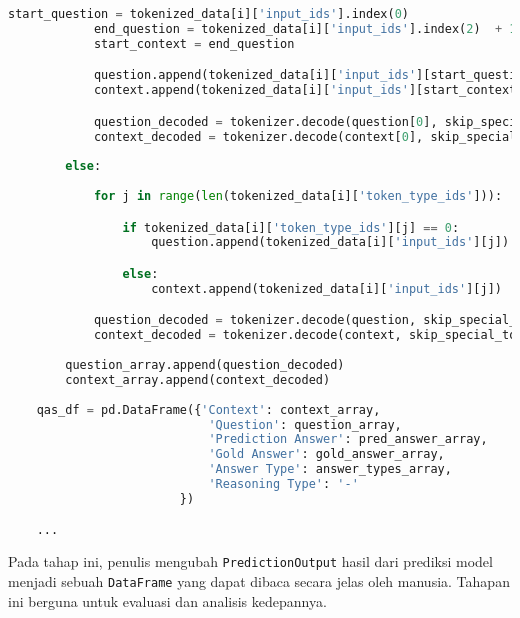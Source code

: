 \begin{lstlisting}[language=Python, caption=Representasi prediksi jawaban untuk evaluasi dan analisis]
            start_question = tokenized_data[i]['input_ids'].index(0)
            end_question = tokenized_data[i]['input_ids'].index(2)  + 1
            start_context = end_question

            question.append(tokenized_data[i]['input_ids'][start_question: end_question])
            context.append(tokenized_data[i]['input_ids'][start_context: ])

            question_decoded = tokenizer.decode(question[0], skip_special_tokens=True)
            context_decoded = tokenizer.decode(context[0], skip_special_tokens=True)
            
        else:
            
            for j in range(len(tokenized_data[i]['token_type_ids'])):

                if tokenized_data[i]['token_type_ids'][j] == 0:
                    question.append(tokenized_data[i]['input_ids'][j])

                else:
                    context.append(tokenized_data[i]['input_ids'][j])

            question_decoded = tokenizer.decode(question, skip_special_tokens=True)
            context_decoded = tokenizer.decode(context, skip_special_tokens=True)
        
        question_array.append(question_decoded)
        context_array.append(context_decoded)
        
    qas_df = pd.DataFrame({'Context': context_array, 
                            'Question': question_array, 
                            'Prediction Answer': pred_answer_array,
                            'Gold Answer': gold_answer_array,
                            'Answer Type': answer_types_array,
                            'Reasoning Type': '-'
                        })

    ...
\end{lstlisting}

Pada tahap ini, penulis mengubah \texttt{PredictionOutput} hasil dari prediksi model menjadi sebuah \texttt{DataFrame} yang dapat dibaca secara jelas oleh manusia. Tahapan ini berguna untuk evaluasi dan analisis kedepannya.

